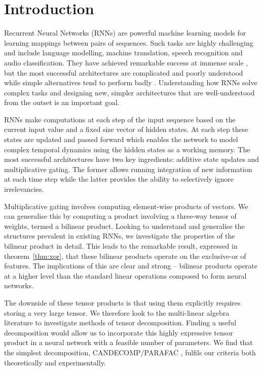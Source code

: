 \chapter{Introduction}\label{C:intro}
Recurrent Neural Networks (RNNs) are powerful machine learning models for learning mappings between
pairs of sequences. Such tasks are highly challenging and include language modelling,
machine translation, speech recognition and audio classification. They have achieved remarkable
success at immense scale \autocite{Wu2016a}, but the most successful architectures are
complicated and poorly understood while simple alternatives tend to perform badly \autocite{Bengio1994}. Understanding how RNNs 
solve complex tasks and designing new, simpler architectures that are well-understood from the
outset is an important goal.

RNNs make computations at each step of the input sequence based on the current input value and
a fixed size vector of hidden states. At each step these states are updated and passed forward which enables
the network to model complex temporal dynamics using the hidden states as a working memory. 
The most successful architectures have two key ingredients:
additive state updates and multiplicative gating. The former allows running integration of new information
at each time step while the latter provides the ability to selectively ignore irrelevancies. 

Multiplicative gating involves computing element-wise products of vectors. We can
generalise this by computing a product involving a three-way tensor of weights, termed
a bilinear product. Looking to understand and generalise the structures prevalent in
existing RNNs, we investigate the properties of the bilinear product in detail. 
This leads to the remarkable
result, expressed in theorem~\ref{thm:xor}, that these bilinear products operate on the exclusive-or
of features. The implications of this are clear and strong -- bilinear products operate
at a higher level than the standard linear operations composed to form neural networks.

The downside of these tensor products is that using them explicitly requires storing a very large tensor.
We therefore look to the multi-linear algebra literature to investigate methods of
tensor decomposition. Finding a useful decomposition would allow us to incorporate this highly expressive
tensor product in a neural network with a feasible number of parameters. We find that the simplest
decomposition, CANDECOMP/PARAFAC \autocite{Carroll1970, Harshman1970}, fulfils our criteria
both theoretically and experimentally.

